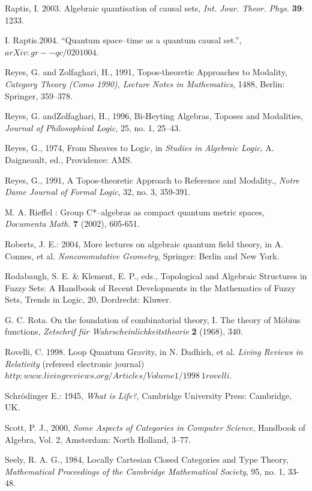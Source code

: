\documentclass[12pt]{article}
\theoremstyle{plain}
\theoremstyle{definition}
\numberwithin{equation}{section}
\begin{document}
\begin{thebibliography}{99}
Raptis, I. 2003. Algebraic quantisation of causal sets, \emph{Int. Jour. Theor. Phys.} \textbf{39}: 1233.

I. Raptis.2004. ``Quantum space--time as a quantum causal set.'', $arXiv:gr--qc/0201004$.

Reyes, G. and Zolfaghari, H., 1991, Topos-theoretic Approaches to Modality, 
\emph{Category Theory (Como 1990), Lecture Notes in Mathematics}, 1488, Berlin: Springer, 359--378. 

Reyes, G. andZolfaghari, H., 1996, Bi-Heyting Algebras, Toposes and Modalities, \emph{Journal of Philosophical Logic}, 25, no. 1, 25--43. 

Reyes, G., 1974, From Sheaves to Logic, in \emph{Studies in Algebraic Logic}, A. Daigneault, ed., Providence: AMS. 

Reyes, G., 1991, A Topos-theoretic Approach to Reference and Modality., \emph{Notre Dame Journal of Formal Logic}, 32, no. 3, 359-391.

M. A. Rieffel : Group C*--algebras as compact quantum metric spaces, \emph{Documenta Math.} \textbf{7} (2002), 605-651.

Roberts, J. E.: 2004, More lectures on algebraic quantum field theory, in A. Connes, et al. \emph{Noncommutative Geometry}, Springer: Berlin and New York.

Rodabaugh, S. E. \& Klement, E. P., eds., Topological and Algebraic Structures in Fuzzy Sets: A Handbook of Recent Developments in the Mathematics of Fuzzy Sets, Trends in Logic, 20, Dordrecht: Kluwer. 

G. C. Rota. On the foundation of combinatorial theory, I. The theory of M\"obius functions, \emph{Zetschrif f\"ur
Wahrscheinlichkeitstheorie} \textbf{2} (1968), 340.

Rovelli, C. 1998. Loop Quantum Gravity, in N. Dadhich, et al. \emph{Living Reviews in Relativity} (refereed electronic journal) $http:www.livingreviews.org/Articles/Volume1/1998~1 rovelli$.

Schr\"odinger E.: 1945, \emph{What is Life?}, Cambridge University Press:
Cambridge, UK.

Scott, P. J., 2000, {\em Some Aspects of Categories in Computer Science}, Handbook of Algebra, Vol. 2, Amsterdam: North Holland, 3--77. 

Seely, R. A. G., 1984, Locally Cartesian Closed Categories and Type Theory, \emph{Mathematical Proceedings of the Cambridge Mathematical Society}, 95, no. 1, 33-48. 


\end{thebibliography}
\end{document}
